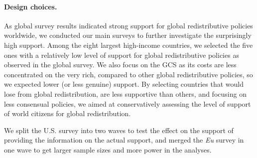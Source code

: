 \begin{bibunit}
\begin{small}

\paragraph{\small Design choices.}

As global survey results indicated strong support for global redistributive policies worldwide, we conducted our main surveys to further investigate the surprisingly high support.  %
Among the eight largest high-income countries, we selected the five ones with a relatively low level of support for global redistributive policies as observed in the global survey. We also focus on the GCS as its costs are less concentrated on the very rich, compared to other global redistributive policies, so we expected lower (or less genuine) support. By selecting countries that would lose from global redistribution, are less supportive than others, and focusing on less consensual policies, we aimed at conservatively assessing the level of support of world citizens for global redistribution. 

We split the U.S. survey into two waves to test the effect on the support of providing the information on the actual support, and merged the \textit{Eu} survey in one wave to get larger sample sizes and more power in the analyses. 


\end{small}
\end{bibunit}
